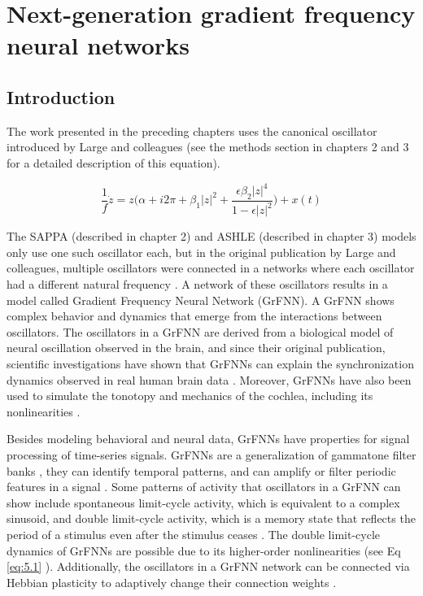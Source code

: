\documentclass{report}
\begin{document}
\chapter{Next-generation gradient frequency neural networks}

\section{Introduction}

The work presented in the preceding chapters uses the canonical oscillator introduced by Large and colleagues \cite{large2010canonical} (see the methods section in chapters 2 and 3 for a detailed description of this equation).  

\begin{equation}
\frac{1}{f}\dot{z} = z\bigg(\alpha + i2\pi + \beta_1|z|^2 + \frac{\epsilon\beta_2|z|^4}{1-\epsilon|z|^2}\bigg) + x(t) \label{eq:5.1}
\end{equation}

The SAPPA (described in chapter 2) and ASHLE (described in chapter 3) models only use one such oscillator each, but in the original publication by Large and colleagues, multiple oscillators were connected in a networks where each oscillator had a different natural frequency \cite{large2010canonical}. A network of these oscillators results in a model called Gradient Frequency Neural Network (GrFNN). A GrFNN shows complex behavior and dynamics that emerge from the interactions between oscillators. The oscillators in a GrFNN are derived from a biological model of neural oscillation observed in the brain, and since their original publication, scientific investigations have shown that GrFNNs can explain the synchronization dynamics observed in real human brain data \cite{tal2017neural}. Moreover, GrFNNs have also been used to simulate the tonotopy and mechanics of the cochlea, including its nonlinearities \cite{lerud2019canonical}.

Besides modeling behavioral and neural data, GrFNNs have properties for signal processing of time-series signals\cite{kim2015signal}. GrFNNs are a generalization of gammatone filter banks \cite{large2015learning}, they can identify temporal patterns, and can amplify or filter periodic features in a signal \cite{kim2015signal}. Some patterns of activity that oscillators in a GrFNN can show include spontaneous limit-cycle activity, which is equivalent to a complex sinusoid, and double limit-cycle activity, which is a memory state that reflects the period of a stimulus even after the stimulus ceases \cite{kim2015signal}. The double limit-cycle dynamics of GrFNNs are possible due to its higher-order nonlinearities (see Eq \eqref{eq:5.1} \cite{large2010canonical, kim2015signal}). Additionally, the oscillators in a GrFNN network can be connected via Hebbian plasticity to adaptively change their connection weights \cite{lambert2016adaptive, kim2017dynamical}. 
\end{document}
